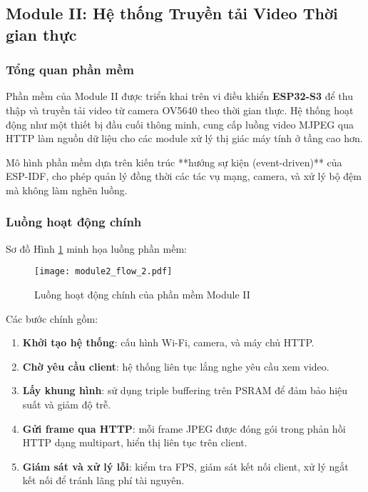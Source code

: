 \subsection{Module II: Hệ thống Truyền tải Video Thời gian thực}
\label{sec:module_ii_software}

\subsubsection{Tổng quan phần mềm}
Phần mềm của Module II được triển khai trên vi điều khiển \textbf{ESP32-S3} để thu thập và truyền tải video từ camera OV5640 theo thời gian thực. Hệ thống hoạt động như một thiết bị đầu cuối thông minh, cung cấp luồng video MJPEG qua HTTP làm nguồn dữ liệu cho các module xử lý thị giác máy tính ở tầng cao hơn.  

Mô hình phần mềm dựa trên kiến trúc **hướng sự kiện (event-driven)** của ESP-IDF, cho phép quản lý đồng thời các tác vụ mạng, camera, và xử lý bộ đệm mà không làm nghẽn luồng.

\subsubsection{Luồng hoạt động chính}
Sơ đồ Hình \ref{fig:sw_architecture_flow} minh họa luồng phần mềm:

\begin{figure}[H]
    \centering
    \texttt{[image: module2\_flow\_2.pdf]}
    \caption{Luồng hoạt động chính của phần mềm Module II}
    \label{fig:sw_architecture_flow}
\end{figure}

Các bước chính gồm:

\begin{enumerate}
    \item \textbf{Khởi tạo hệ thống}: cấu hình Wi-Fi, camera, và máy chủ HTTP.
    \item \textbf{Chờ yêu cầu client}: hệ thống liên tục lắng nghe yêu cầu xem video.
    \item \textbf{Lấy khung hình}: sử dụng triple buffering trên PSRAM để đảm bảo hiệu suất và giảm độ trễ.
    \item \textbf{Gửi frame qua HTTP}: mỗi frame JPEG được đóng gói trong phản hồi HTTP dạng multipart, hiển thị liên tục trên client.
    \item \textbf{Giám sát và xử lý lỗi}: kiểm tra FPS, giám sát kết nối client, xử lý ngắt kết nối để tránh lãng phí tài nguyên.
\end{enumerate}

